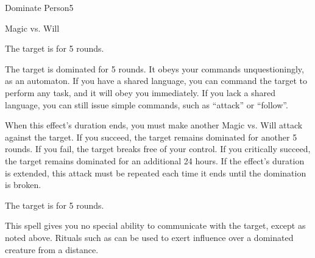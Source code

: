 \begin{spellsection}{Dominate Person}{5}
    \begin{spellheader}
    \end{spellheader}
    \begin{spellcontent}
        \begin{spelltargetinginfo}
        \end{spelltargetinginfo}
        \begin{spelleffects}
            \begin{spellattack}{Magic vs. Will}

                \spellsuccess The target is \confused for 5 rounds.

                \spellcritical The target is dominated for 5 rounds. It obeys your commands unquestioningly, as an automaton. If you have a shared language, you can command the target to perform any task, and it will obey you immediately. If you lack a shared language, you can still issue simple commands, such as ``attack'' or ``follow''.

                When this effect's duration ends, you must make another Magic vs. Will attack against the target. If you succeed, the target remains dominated for another 5 rounds. If you fail, the target breaks free of your control. If you critically succeed, the target remains dominated for an additional 24 hours. If the effect's duration is extended, this attack must be repeated each time it ends until the domination is broken.

                \spellfailure The target is \dazed for 5 rounds.
            \end{spellattack}
            \spelldur \durshort \dismissable
        \end{spelleffects}
    \end{spellcontent}
    \begin{spellfooter}
        \spellnotes This spell gives you no special ability to communicate with the target, except as noted above. Rituals such as  can be used to exert influence over a dominated creature from a distance.
        \miscastrandom
    \end{spellfooter}
\end{spellsection}

